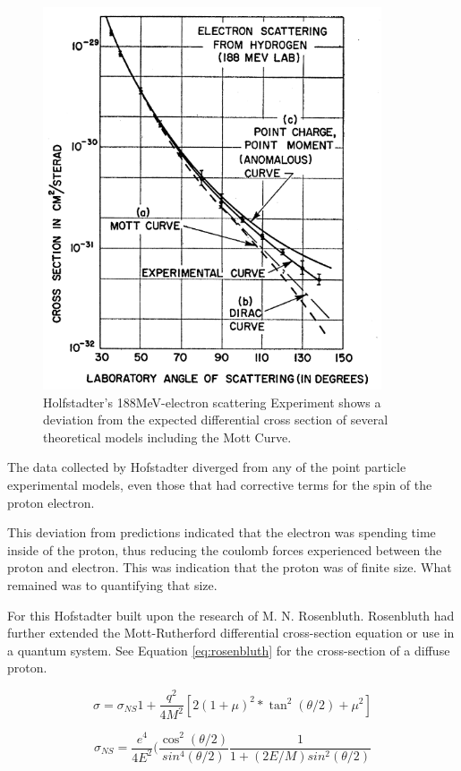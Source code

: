 \documentclass[12pt]{article}
\begin{document}
\begin{figure}
    \centering
    \includegraphics[width = 10cm]{mott_dirac_188mev}
    \caption{Holfstadter's 188MeV-electron scattering Experiment shows a deviation from the expected differential cross section of several theoretical models including the Mott Curve.}
    \label{fig:ruthenergy}
\end{figure}

The data collected by Hofstadter diverged from any of the point particle experimental models, even those that had corrective terms for the spin of the proton electron.

This deviation from predictions indicated that the electron was spending time inside of the proton, thus reducing the coulomb forces experienced between the proton and electron.
This was indication that the proton was of finite size. What remained was to quantifying that size.

For this Hofstadter built upon the research of M. N. Rosenbluth. Rosenbluth had further extended the Mott-Rutherford differential cross-section equation or use in a quantum system. See Equation \ref{eq:rosenbluth} for the cross-section of a diffuse proton\cite{McAllister1956}.

\begin{equation}\label{eq:rosenbluth}
\sigma = \sigma_{NS}{1 + \frac{q^2}{4M^2}[2(1+\mu)^2*\tan^2(\theta/2)+\mu^2]}
\end{equation}

\begin{equation}\label{Rosenbluth1950}
    \sigma_{NS} = \frac{e^4}{4E^2}(\frac{\cos^2(\theta/2)}{sin^4(\theta/2)}\frac{1}{1+(2E/M)sin^2(\theta/2)}
\end{equation}
\end{document}
